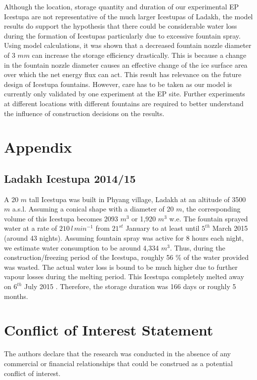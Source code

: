 \documentclass[utf8]{frontiersSCNS} %
\begin{document}
Although the location, storage quantity and duration of our experimental EP Icestupa are not representative of
the much larger Icestupas of Ladakh, the model results do support the hypothesis that there could be considerable
water loss during the formation of Icestupas particularly due to excessive fountain spray. Using model calculations,
it was shown that a decreased fountain nozzle diameter of 3 $mm$ can increase the storage efficiency drastically. This
is because a change in the fountain nozzle diameter causes an effective change of the ice surface area over which the
net energy flux can act. This result has relevance on the future design of Icestupa fountains. However, care has to be
taken as our model is currently only validated by one experiment at the EP site. Further experiments at
different locations with different fountains are required to better understand the influence of construction decisions
on the results. 



\section{Appendix}

\subsection{Ladakh Icestupa 2014/15} \label{section:ladakhloss} A 20 $m$ tall Icestupa \citep{iceheight} was built in
Phyang village, Ladakh at an altitude of 3500 $m$ a.s.l. Assuming a conical shape with a diameter of 20 $m$, the
corresponding volume of this Icestupa becomes 2093 $m^3$ or 1,920 $m^3$ w.e. The fountain sprayed water at a rate
of $210\, l\,min^{-1}$ \citep{waterinput} from $21^{st}$ January \citep{waterstart} to at least until $5^{th}$ March
2015 \citep{waterend} (around 43 nights). Assuming fountain spray was active for 8 hours each night, we estimate water
consumption to be around 4,334 $m^3$. Thus, during the construction/freezing period of the Icestupa, roughly 56 \%
of the water provided was wasted. The actual water loss is bound to be much higher due to further vapour losses during
the melting period. This Icestupa completely melted away on $6^{th}$ July 2015 \citep{iceends}. Therefore, the storage
duration was 166 days or roughly 5 months. 


\section*{Conflict of Interest Statement} The authors declare that the research was conducted in the absence of any
commercial or financial relationships that could be construed as a potential conflict of interest.
\end{document}
